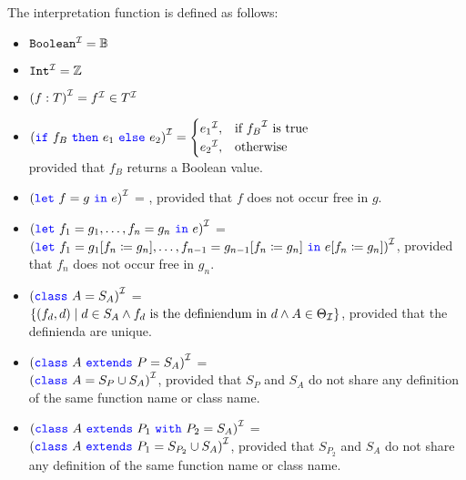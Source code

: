 The interpretation function is defined as follows:
\begin{itemize}
    \item ${\texttt{{Boolean}}}^{\mathcal{I}} = \mathbb{B}$
    \item ${\texttt{{Int}}}^{\mathcal{I}} = \mathbb{Z}$

    \item ${(f : T)}^{\mathcal{I}} = {f}^{\mathcal{I}} \in {T}^{\mathcal{I}}$

    \item $\I{(\sif\ f_{B} \ \sthen\ e_{1} \ \selse\ e_{2})} =
    \begin{cases}
        \I{e_{1}}, & \text{if } \I{f_{B}} \text{ is true }\\
        \I{e_{2}}, & \text{otherwise}
    \end{cases}
    $\\
    provided that $f_{B}$ returns a Boolean value.

    \item ${({\color{blue}\texttt{{let}}}\ f = g \ {\color{blue}\texttt{{in}}}\ e)}^{\mathcal{I}}$ =
    , provided that $f$ does not occur free in $g$.

    \item ${({\color{blue}\texttt{{let}}}\ f_{1} = g_{1}, \ldots , f_{n} = g_{n} \ {\color{blue}\texttt{{in}}}\ e)}^{\mathcal{I}}$ = \\
    $\I{(\slet\ f_{1} = g_{1}[f_{n} \coloneqq g_{n}], \ldots , f_{n - 1} = g_{n - 1}[f_{n} \coloneqq g_{n}] \ \sdin\ e[f_{n} \coloneqq g_{n}])}$, provided that $f_{n}$ does not occur free in $g_{n}$.

    \item ${({\color{blue}\texttt{{class}}}\ A = S_{A})}^{\mathcal{I}}$ = \\
    $\{ (f_{d}, d) \mid d \in S_{A} \land f_{d} \text{ is the definiendum in } d \land A \in \Theta _{\mathcal{I}} \}$, provided that the definienda are unique.

    \item ${({\color{blue}\texttt{{class}}}\ A \ {\color{blue}\texttt{{extends}}}\ P = S_{A})}^{\mathcal{I}}$ = \\
    ${({\color{blue}\texttt{{class}}}\ A = S_{P} \cup S_{A})}^{\mathcal{I}}$, provided that $S_{P}$ and $S_{A}$ do not share any definition of the same function name or class name.

    \item $\I{(\sclass\ A \ \sextends\ P_{1} \ \swith\ P_{2} = S_{A})}$ = \\
    ${({\color{blue}\texttt{{class}}}\ A \ {\color{blue}\texttt{{extends}}}\ P_{1} = S_{P_{2}} \cup S_{A})}^{\mathcal{I}}$, provided that $S_{P_{2}}$ and $S_{A}$ do not share any definition of the same function name or class name.

\end{itemize}

